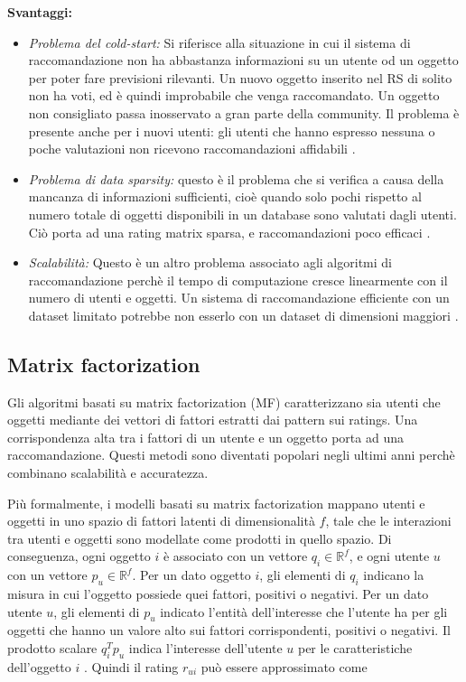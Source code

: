 \documentclass[12pt,italian]{report}
\begin{document}
\noindent \textbf{Svantaggi:}
\begin{itemize}
 \item \textit{Problema del cold-start:} Si riferisce alla situazione in cui il sistema di raccomandazione non ha abbastanza informazioni su un utente od un oggetto per poter fare previsioni rilevanti. Un nuovo oggetto inserito nel RS di solito non ha voti, ed è quindi improbabile che venga raccomandato. Un oggetto non consigliato passa inosservato a gran parte della community. Il problema è presente anche per i nuovi utenti: gli utenti che hanno espresso nessuna o poche valutazioni non ricevono raccomandazioni affidabili \cite{cold-start}.   
 
 \item  \textit{Problema di data sparsity:} questo è il problema che si verifica a causa della mancanza di informazioni sufficienti, cioè quando solo pochi rispetto al numero totale di oggetti disponibili in un database sono valutati dagli utenti. Ciò porta ad una rating matrix sparsa, e raccomandazioni poco efficaci \cite{recsys-principle-methods-evaluation}.
 
 \item \textit{Scalabilità:} Questo è un altro problema associato agli algoritmi di raccomandazione perchè il tempo di computazione cresce linearmente con il numero di utenti e oggetti. Un sistema di raccomandazione efficiente con un dataset limitato potrebbe non esserlo con un dataset di dimensioni maggiori \cite{recsys-principle-methods-evaluation}.
\end{itemize}

\subsection{Matrix factorization} \label{ssec:mf}
Gli algoritmi basati su matrix factorization (MF) caratterizzano sia utenti che oggetti mediante dei vettori di fattori estratti dai pattern sui ratings. Una corrispondenza alta tra i fattori di un utente e un oggetto porta ad una raccomandazione. Questi metodi sono diventati popolari negli ultimi anni perchè combinano scalabilità e accuratezza.

Più formalmente, i modelli basati su matrix factorization mappano utenti e oggetti in uno spazio di fattori latenti di dimensionalità $f$, tale che le interazioni tra utenti e oggetti sono modellate come prodotti in quello spazio. Di conseguenza, ogni oggetto $i$ è associato con un vettore $q_i \in \mathbb{R}^f$, e ogni utente $u$ con un vettore $p_u \in \mathbb{R}^f$. Per un dato oggetto $i$, gli elementi di $q_i$ indicano la misura in cui l'oggetto possiede quei fattori, positivi o negativi. Per un dato utente $u$, gli elementi di $p_u$ indicato l'entità dell'interesse che l'utente ha per gli oggetti che hanno un valore alto sui fattori corrispondenti, positivi o negativi. Il prodotto scalare $q_i^Tp_u$ indica l'interesse dell'utente $u$ per le caratteristiche dell'oggetto $i$ \cite{matrix-factorization}. Quindi il rating $r_{ui}$ può essere approssimato come
\end{document}
